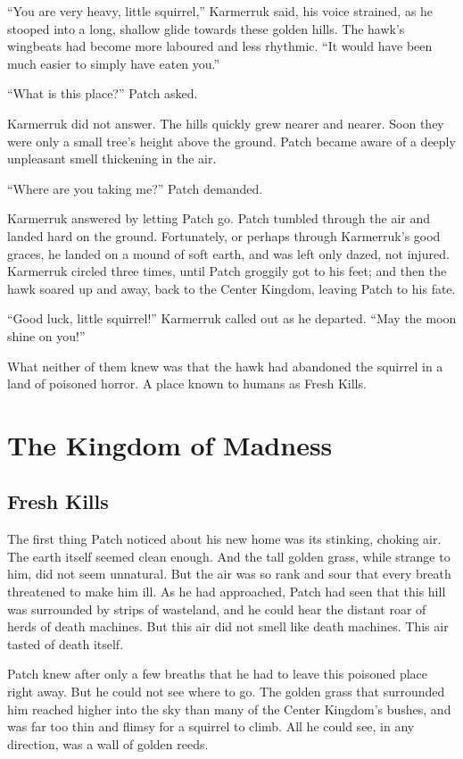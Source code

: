 \documentclass[ebook,oneside,openany,17pt]{memoir}
\renewcommand{\thechapter}{\Roman{chapter}}
\newcounter{sections}
\newcommand{\sections}[1]{%
  \section*{#1}
  \addtocounter{sections}{1}%
  \pdfbookmark[1]{#1}{section.\thechapter.\thesections}}
\begin{document}
“You are very heavy, little squirrel,” Karmerruk said, his voice
strained, as he stooped into a long, shallow glide towards these
golden hills. The hawk’s wingbeats had become more laboured and less
rhythmic. “It would have been much easier to simply have eaten you.”

“What is this place?” Patch asked.

Karmerruk did not answer. The hills quickly grew nearer and
nearer. Soon they were only a small tree’s height above the
ground. Patch became aware of a deeply unpleasant smell thickening in
the air.

“Where are you taking me?” Patch demanded.

Karmerruk answered by letting Patch go. Patch tumbled through the air
and landed hard on the ground. Fortunately, or perhaps through
Karmerruk’s good graces, he landed on a mound of soft earth, and was
left only dazed, not injured. Karmerruk circled three times, until
Patch groggily got to his feet; and then the hawk soared up and away,
back to the Center Kingdom, leaving Patch to his fate.

“Good luck, little squirrel!” Karmerruk called out as he
departed. “May the moon shine on you!”

What neither of them knew was that the hawk had abandoned the squirrel
in a land of poisoned horror. A place known to humans as Fresh Kills.



\chapter{The Kingdom of Madness}

\sections{Fresh Kills}

The first thing Patch noticed about his new home was its stinking,
choking air. The earth itself seemed clean enough. And the tall golden
grass, while strange to him, did not seem unnatural. But the air was
so rank and sour that every breath threatened to make him ill. As he
had approached, Patch had seen that this hill was surrounded by strips
of wasteland, and he could hear the distant roar of herds of death
machines. But this air did not smell like death machines. This air
tasted of death itself.

Patch knew after only a few breaths that he had to leave this poisoned
place right away. But he could not see where to go. The golden grass
that surrounded him reached higher into the sky than many of the
Center Kingdom’s bushes, and was far too thin and flimsy for a
squirrel to climb. All he could see, in any direction, was a wall of
golden reeds.
\end{document}
